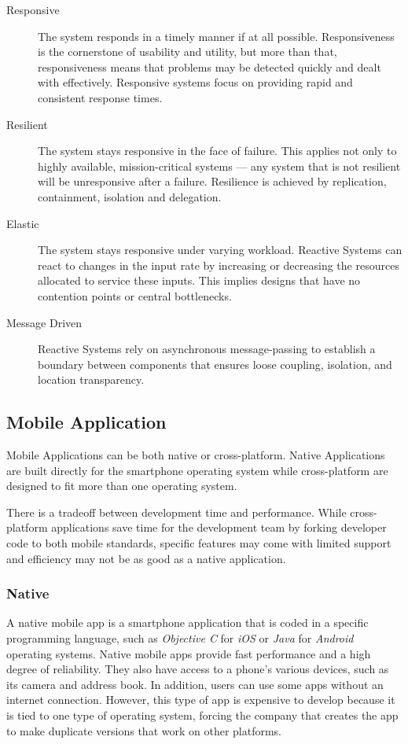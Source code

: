 \begin{description}
	\item [Responsive] The system responds in a timely manner if at all possible. Responsiveness is the cornerstone of usability and utility, but more than that, responsiveness means that problems may be detected quickly and dealt with effectively. Responsive systems focus on providing rapid and consistent response times.
	\item [Resilient] The system stays responsive in the face of failure. This applies not only to highly available, mission-critical systems — any system that is not resilient will be unresponsive after a failure. Resilience is achieved by replication, containment, isolation and delegation.
	\item [Elastic] The system stays responsive under varying workload. Reactive Systems can react to changes in the input rate by increasing or decreasing the resources allocated to service these inputs. This implies designs that have no contention points or central bottlenecks.
	\item [Message Driven] Reactive Systems rely on asynchronous message-passing to establish a boundary between components that ensures loose coupling, isolation, and location transparency.
\end{description}

\subsection{Mobile Application}

Mobile Applications can be both native or cross-platform. Native Applications are built directly for the smartphone operating system while cross-platform are designed to fit more than one operating system.

There is a tradeoff between development time and performance. While cross-platform applications save time for the development team by forking developer code to both mobile standards, specific features may come with limited support and efficiency may not be as good as a native application.

\subsubsection{Native}

A native mobile app is a smartphone application that is coded in a specific programming language, such as \emph{Objective C} for \emph{iOS} or \emph{Java} for \emph{Android} operating systems. Native mobile apps provide fast performance and a high degree of reliability. They also have access to a phone's various devices, such as its camera and address book. In addition, users can use some apps without an internet connection. However, this type of app is expensive to develop because it is tied to one type of operating system, forcing the company that creates the app to make duplicate versions that work on other platforms.


